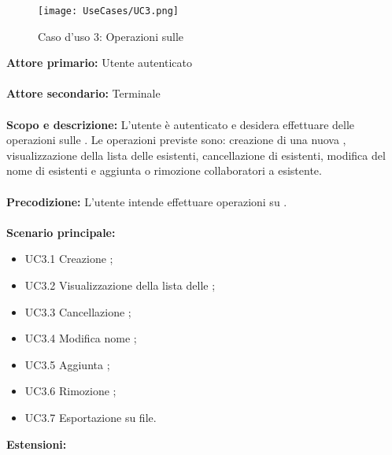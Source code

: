 \documentclass{scalatekids-article}
\begin{document}
\begin{figure}[H]
  \begin{center}
    \texttt{[image: UseCases/UC3.png]}
    \caption*{Caso d'uso 3: Operazioni sulle }
  \end{center}
\end{figure}
\textbf{Attore primario:} Utente autenticato\\ \\
\textbf{Attore secondario:} Terminale\\ \\
\textbf{Scopo e descrizione:} L'utente è autenticato e desidera effettuare delle operazioni sulle . Le operazioni previste sono:
creazione di una nuova , visualizzazione della lista delle  esistenti, cancellazione di  esistenti, modifica del nome di  esistenti e
aggiunta o rimozione collaboratori a  esistente.\\ \\
\textbf{Precodizione:} L'utente intende effettuare operazioni su .\\ \\
\textbf{Scenario principale:}
\begin{itemize}
\item UC3.1 Creazione ;
\item UC3.2 Visualizzazione della lista delle ;
\item UC3.3 Cancellazione ;
\item UC3.4 Modifica nome ;
\item UC3.5 Aggiunta ;
\item UC3.6 Rimozione ;
\item UC3.7 Esportazione su file.
\end{itemize}
\textbf{Estensioni:}
\end{document}
